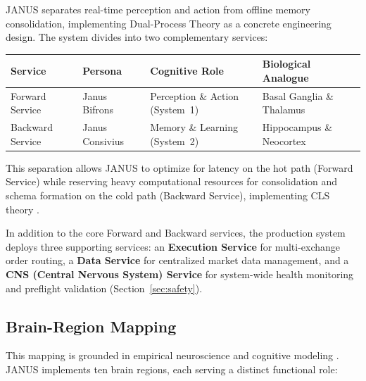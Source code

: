 \documentclass[12pt, a4paper]{article}
\begin{document}
JANUS separates real-time perception and action from offline memory consolidation, implementing Dual-Process Theory \citep{kahneman2011thinking, evans2008dual, evans2013dualprocess} as a concrete engineering design. The system divides into two complementary services:

\begin{table}[htbp]
	\centering
	\begin{tabularx}{\textwidth}{|l|l|L|L|}
		\hline
		\textbf{Service} & \textbf{Persona} & \textbf{Cognitive Role}         & \textbf{Biological Analogue} \\
		\hline
		Forward Service  & Janus Bifrons    & Perception \& Action (System~1) & Basal Ganglia \& Thalamus    \\
		Backward Service & Janus Consivius  & Memory \& Learning (System~2)   & Hippocampus \& Neocortex     \\
		\hline
	\end{tabularx}
\end{table}

This separation allows JANUS to optimize for latency on the hot path (Forward Service) while reserving heavy computational resources for consolidation and schema formation on the cold path (Backward Service), implementing CLS theory \citep{mcclelland1995complementary, kumaran2016cls}.

In addition to the core Forward and Backward services, the production system deploys three supporting services: an \textbf{Execution Service} for multi-exchange order routing, a \textbf{Data Service} for centralized market data management, and a \textbf{CNS (Central Nervous System) Service} for system-wide health monitoring and preflight validation (Section~\ref{sec:safety}).

\subsection{Brain-Region Mapping}
\label{sec:brain_mapping}

This mapping is grounded in empirical neuroscience and cognitive modeling \citep{frank2006working, collins2014opponent, foster2013hierarchical}. JANUS implements ten brain regions, each serving a distinct functional role:
\end{document}
